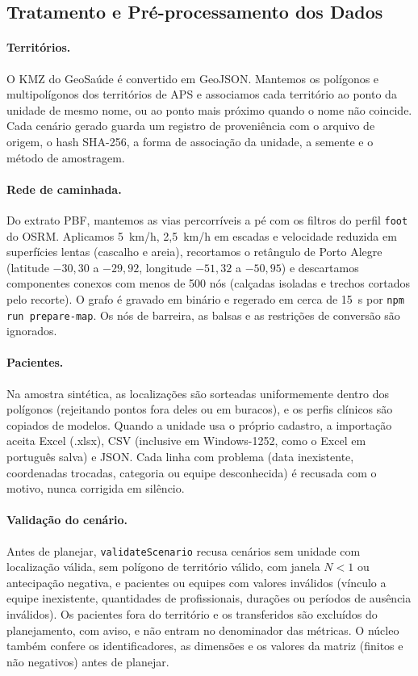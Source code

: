 \documentclass[11pt,a4paper]{article}
\begin{document}
\subsection{Tratamento e Pré-processamento dos Dados}

\paragraph{Territórios.} O KMZ do GeoSaúde é convertido em GeoJSON. Mantemos os polígonos e multipolígonos dos territórios de APS e associamos cada território ao ponto da unidade de mesmo nome, ou ao ponto mais próximo quando o nome não coincide. Cada cenário gerado guarda um registro de proveniência com o arquivo de origem, o hash SHA-256, a forma de associação da unidade, a semente e o método de amostragem.

\paragraph{Rede de caminhada.} Do extrato PBF, mantemos as vias percorríveis a pé com os filtros do perfil \texttt{foot} do OSRM. Aplicamos 5~km/h, 2,5~km/h em escadas e velocidade reduzida em superfícies lentas (cascalho e areia), recortamos o retângulo de Porto Alegre (latitude $-30{,}30$ a $-29{,}92$, longitude $-51{,}32$ a $-50{,}95$) e descartamos componentes conexos com menos de 500 nós (calçadas isoladas e trechos cortados pelo recorte). O grafo é gravado em binário e regerado em cerca de 15~s por \texttt{npm run prepare-map}. Os nós de barreira, as balsas e as restrições de conversão são ignorados.

\paragraph{Pacientes.} Na amostra sintética, as localizações são sorteadas uniformemente dentro dos polígonos (rejeitando pontos fora deles ou em buracos), e os perfis clínicos são copiados de modelos. Quando a unidade usa o próprio cadastro, a importação aceita Excel (.xlsx), CSV (inclusive em Windows-1252, como o Excel em português salva) e JSON. Cada linha com problema (data inexistente, coordenadas trocadas, categoria ou equipe desconhecida) é recusada com o motivo, nunca corrigida em silêncio.

\paragraph{Validação do cenário.} Antes de planejar, \texttt{validateScenario} recusa cenários sem unidade com localização válida, sem polígono de território válido, com janela $N < 1$ ou antecipação negativa, e pacientes ou equipes com valores inválidos (vínculo a equipe inexistente, quantidades de profissionais, durações ou períodos de ausência inválidos). Os pacientes fora do território e os transferidos são excluídos do planejamento, com aviso, e não entram no denominador das métricas. O núcleo também confere os identificadores, as dimensões e os valores da matriz (finitos e não negativos) antes de planejar.
\end{document}
